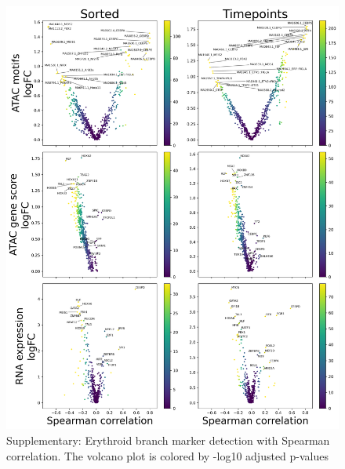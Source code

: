 \documentclass[a4paper]{article}
\begin{document}
\begin{figure}[!htb]
  \centering
  \includegraphics[width=\textwidth]{../figures/hematopoiesis/Monocyte_40_15_smooth_none_single_branch_volcanos_motifs.png}
  \caption{Supplementary: Erythroid branch marker detection with Spearman correlation. The volcano plot is colored by -log10 adjusted p-values}
\end{figure}
\end{document}
